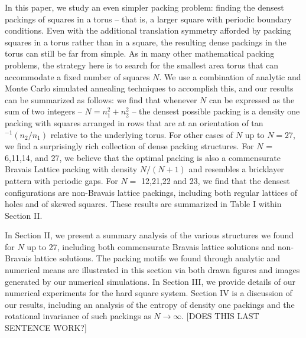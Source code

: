 In this paper, we study an even simpler packing problem: finding the densest packings of squares in a torus -- that is, a larger square with periodic boundary conditions. Even with the additional translation symmetry afforded by packing squares in a torus rather than in a square, the resulting dense packings in the torus can still be far from simple. As in many other mathematical packing problems, the strategy here is to search for the smallest area torus that can accommodate a fixed number of squares $N$.  We use a combination of analytic and Monte Carlo simulated annealing techniques to accomplish this, and our results can be summarized as follows: we find that whenever $N$ can be expressed as the sum of two integers -- $N=n_1^2+n_2^2$ -- the densest possible packing is a density one packing with squares arranged in rows that are at an orientation of tan$^{-1}(n_2/n_1)$ relative to the underlying torus.  For other cases of $N$ up to $N=27$, we find a surprisingly rich collection of dense packing structures. For $N$ = 6,11,14, and 27, we believe that the optimal packing is also a commensurate Bravais Lattice packing with density $N/(N+1)$ and resembles a bricklayer pattern with periodic gaps.  For $N=$ 12,21,22 and 23, we find that the densest configurations are non-Bravais lattice packings, including both regular lattices of holes and of skewed squares. These results are summarized in Table I within Section II.

In Section II, we present a summary analysis of the various structures we found for $N$ up to 27, including both commensurate Bravais lattice solutions and non-Bravais lattice solutions.  The packing motifs we found through analytic and numerical means are illustrated in this section via both drawn figures and images generated by our numerical simulations. In Section III, we provide details of our numerical experiments for the hard square system. Section IV is a discussion of our results, including an analysis of the entropy of density one packings and the rotational invariance of such packings as $N \rightarrow \infty$. [DOES THIS LAST SENTENCE WORK?]

